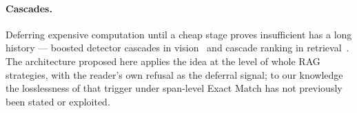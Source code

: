 \paragraph{Cascades.}
Deferring expensive computation until a cheap stage proves insufficient has
a long history --- boosted detector cascades in
vision~\cite{viola2001cascade} and cascade ranking in
retrieval~\cite{wang2011cascade}. The architecture proposed here applies
the idea at the level of whole RAG strategies, with the reader's own
refusal as the deferral signal; to our knowledge the losslessness of that
trigger under span-level Exact Match has not previously been stated or
exploited.
